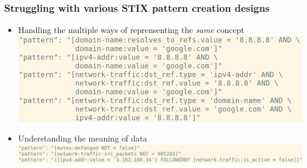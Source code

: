 \begin{frame}
    \frametitle{Struggling with various STIX pattern creation designs}
    \begin{itemize}
        \item Handling the multiple ways of reprensenting the \emph{same} concept
        \includegraphics[scale=0.3]{images/pattern1.png}
        \item Understanding the meaning of data
        \includegraphics[scale=0.3]{images/pattern2.png}
    \end{itemize}
\end{frame}

